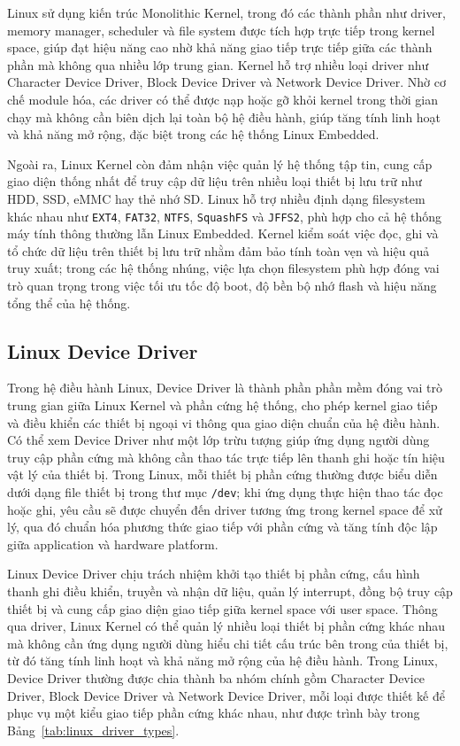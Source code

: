 Linux sử dụng kiến trúc Monolithic Kernel, trong đó các thành phần như driver, memory manager, scheduler và file system được tích hợp trực tiếp trong kernel space, giúp đạt hiệu năng cao nhờ khả năng giao tiếp trực tiếp giữa các thành phần mà không qua nhiều lớp trung gian. Kernel hỗ trợ nhiều loại driver như Character Device Driver, Block Device Driver và Network Device Driver. Nhờ cơ chế module hóa, các driver có thể được nạp hoặc gỡ khỏi kernel trong thời gian chạy mà không cần biên dịch lại toàn bộ hệ điều hành, giúp tăng tính linh hoạt và khả năng mở rộng, đặc biệt trong các hệ thống Linux Embedded.

Ngoài ra, Linux Kernel còn đảm nhận việc quản lý hệ thống tập tin, cung cấp giao diện thống nhất để truy cập dữ liệu trên nhiều loại thiết bị lưu trữ như HDD, SSD, eMMC hay thẻ nhớ SD. Linux hỗ trợ nhiều định dạng filesystem khác nhau như \texttt{EXT4}, \texttt{FAT32}, \texttt{NTFS}, \texttt{SquashFS} và \texttt{JFFS2}, phù hợp cho cả hệ thống máy tính thông thường lẫn Linux Embedded. Kernel kiểm soát việc đọc, ghi và tổ chức dữ liệu trên thiết bị lưu trữ nhằm đảm bảo tính toàn vẹn và hiệu quả truy xuất; trong các hệ thống nhúng, việc lựa chọn filesystem phù hợp đóng vai trò quan trọng trong việc tối ưu tốc độ boot, độ bền bộ nhớ flash và hiệu năng tổng thể của hệ thống.
\subsection{Linux Device Driver}

Trong hệ điều hành Linux, Device Driver là thành phần phần mềm đóng vai trò trung gian giữa Linux Kernel và phần cứng hệ thống, cho phép kernel giao tiếp và điều khiển các thiết bị ngoại vi thông qua giao diện chuẩn của hệ điều hành.\cite{linux_device_drivers} Có thể xem Device Driver như một lớp trừu tượng giúp ứng dụng người dùng truy cập phần cứng mà không cần thao tác trực tiếp lên thanh ghi hoặc tín hiệu vật lý của thiết bị. Trong Linux, mỗi thiết bị phần cứng thường được biểu diễn dưới dạng file thiết bị trong thư mục \texttt{/dev}; khi ứng dụng thực hiện thao tác đọc hoặc ghi, yêu cầu sẽ được chuyển đến driver tương ứng trong kernel space để xử lý, qua đó chuẩn hóa phương thức giao tiếp với phần cứng và tăng tính độc lập giữa application và hardware platform.

Linux Device Driver chịu trách nhiệm khởi tạo thiết bị phần cứng, cấu hình thanh ghi điều khiển, truyền và nhận dữ liệu, quản lý interrupt, đồng bộ truy cập thiết bị và cung cấp giao diện giao tiếp giữa kernel space với user space. Thông qua driver, Linux Kernel có thể quản lý nhiều loại thiết bị phần cứng khác nhau mà không cần ứng dụng người dùng hiểu chi tiết cấu trúc bên trong của thiết bị, từ đó tăng tính linh hoạt và khả năng mở rộng của hệ điều hành. Trong Linux, Device Driver thường được chia thành ba nhóm chính gồm Character Device Driver, Block Device Driver và Network Device Driver, mỗi loại được thiết kế để phục vụ một kiểu giao tiếp phần cứng khác nhau, như được trình bày trong Bảng~\ref{tab:linux_driver_types}.

